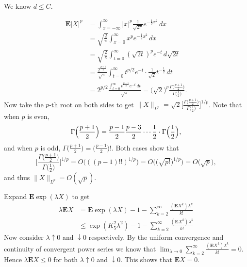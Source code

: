 \documentclass[11pt]{article}
\newcommand{\nm}[1]{\lVert #1 \rVert}
\newcommand{\abs}[1]{\lvert #1 \rvert}
\newcommand{\E}{\mathbf{E}}
\theoremstyle{plain}
\theoremstyle{definition}
\theoremstyle{remark}
\theoremstyle{definition}
\newenvironment{mansol}[1]{%
  \renewcommand\themansolinner{#1}%
  \mansolinner
}{\endmansolinner}
\begin{document}
\begin{mansol}{2.4.3}
    We know $d \leq C$. 
\end{mansol}

\begin{mansol}{2.5.1}
    \begin{align*}
        \E \abs{X}^p & = \int_{x = -\infty}^{\infty} \abs{x}^p \frac{1}{\sqrt{2 \pi}}e^{-\frac{1}{2}x^2}\,dx \\
        & = \sqrt{\frac{2}{\pi}}\int_{x=0}^\infty x^p e^{-\frac{1}{2}x^2}\,dx \\
        & = \sqrt{\frac{2}{\pi}}\int_{t=0}^\infty (\sqrt{2t})^p e^{-t}\,d{\sqrt{2t}} \\
        & = \frac{2^{\frac{p+1}{2}}}{\sqrt{\pi}} \int_{t=0}^\infty t^{p/2} e^{-t} \cdot \frac{1}{\sqrt{2}} t^{-\frac{1}{2}}\,dt \\
        & = 2^{p/2}\frac{\int_{t=0}^\infty t^{\frac{p-1}{2}} e^{-t}\,dt}{\sqrt{\pi}} = \bigl(\sqrt{2}\bigr)^p\frac{\Gamma\bigl(\frac{p+1}{2}\bigr)}{\Gamma\bigl(\frac{1}{2}\bigr)}.
    \end{align*}
    Now take the $p$-th root on both sides to get $\nm{X}_{L^p} = \sqrt{2} \biggl[\frac{\Gamma\bigl(\frac{p+1}{2}\bigr)}{\Gamma\bigl(\frac{1}{2}\bigr)}\biggr]^{1/p}$. Note that when $p$ is even, \[\Gamma\Bigl(\frac{p+1}{2}\Bigr) = \frac{p-1}{2}\frac{p-3}{2}\cdots\frac{1}{2}\cdot\Gamma\Bigl(\frac{1}{2}\Bigr),\] and when $p$ is odd, $\Gamma\bigl(\frac{p+1}{2}\bigr) = \bigl(\frac{p-1}{2}\bigr)!$. Both cases show that \[\biggl[\frac{\Gamma\bigl(\frac{p+1}{2}\bigr)}{\Gamma\bigl(\frac{1}{2}\bigr)}\biggr]^{1/p} = O\bigl(((p-1)!!)^{1/p}\bigr) = 
    O\bigl(\bigl(\sqrt{p!}\bigr)^{1/p}\bigr) = O\bigl(\sqrt{p}\bigr),\] and thus $\nm{X}_{L^p} = O(\sqrt{p})$.
\end{mansol}

\begin{mansol}{2.5.4}
    Expand $\E \exp(\lambda X)$ to get \begin{align*}
        \lambda \E X & = \E \exp(\lambda X) - 1 - \sum_{k=2}^\infty \frac{(\E X^k)\lambda^k}{k!} \\
        & \leq \exp(K_5^2 \lambda^2) - 1 - \sum_{k=2}^\infty \frac{(\E X^k)\lambda^k}{k!}
    \end{align*}
    Now consider $\lambda \uparrow 0$ and $\downarrow 0$ respectively. By the uniform convergence and continuity of convergent power series we know that $\lim_{\lambda \to 0}\sum_{k=2}^\infty \frac{(\E X^k)\lambda^k}{k!} = 0$. Hence $\lambda \E X \leq 0$ for both $\lambda \uparrow 0$ and $\downarrow 0$. This shows that $\E X = 0$.
\end{mansol}
\end{document}
